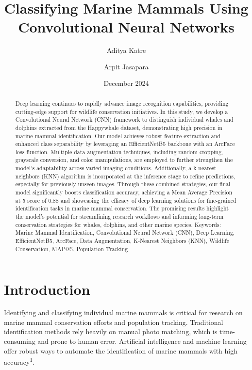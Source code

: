 \documentclass[twocolumn]{article}
\title{Classifying Marine Mammals Using Convolutional Neural Networks}
\author[1]{Aditya Katre}
\author[2]{Arpit Jasapara}
\affil[1]{Del Norte High, San Diego, California}
\affil[2]{University of California Los Angeles, Los Angeles, California}
\begin{document}
\date{December 2024}
\maketitle

\begin{abstract}
Deep learning continues to rapidly advance image recognition capabilities, providing cutting-edge support for wildlife conservation initiatives. In this study, we develop a Convolutional Neural Network (CNN) framework to distinguish individual whales and dolphins extracted from the Happywhale dataset, demonstrating high precision in marine mammal identification. Our model achieves robust feature extraction and enhanced class separability by leveraging an EfficientNetB5 backbone with an ArcFace loss function. Multiple data augmentation techniques, including random cropping, grayscale conversion, and color manipulations, are employed to further strengthen the model’s adaptability across varied imaging conditions. Additionally, a k-nearest neighbors (KNN) algorithm is incorporated at the inference stage to refine predictions, especially for previously unseen images. Through these combined strategies, our final model significantly boosts classification accuracy, achieving a Mean Average Precision at 5 score of 0.88 and showcasing the efficacy of deep learning solutions for fine-grained identification tasks in marine mammal conservation. The promising results highlight the model’s potential for streamlining research workflows and informing long-term conservation strategies for whales, dolphins, and other marine species.
\newline
\newline
Keywords: Marine Mammal Identification, Convolutional Neural Network (CNN), Deep Learning, EfficientNetB5, ArcFace, Data Augmentation, K-Nearest Neighbors (KNN), Wildlife Conservation, MAP@5, Population Tracking
\end{abstract}

\section{Introduction}
Identifying and classifying individual marine mammals is critical for research on marine mammal conservation efforts and population tracking. Traditional identification methods rely heavily on manual photo matching, which is time-consuming and prone to human error. Artificial intelligence and machine learning offer robust ways to automate the identification of marine mammals with high accuracy\textsuperscript{1}.
\end{document}

